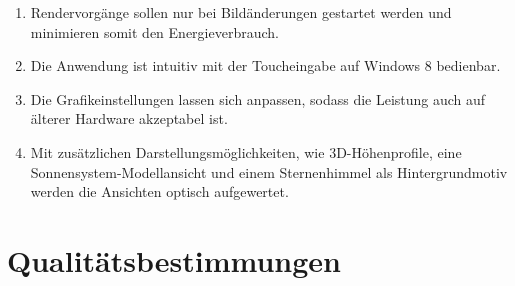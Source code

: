 \documentclass[10pt]{scrreprt}
\newcommand{\ziel}[1]{{\fontsize{9.5}{11}\textsf{/#1/}}}
\newcommand{\ziellabel}{Z}
\newcommand{\wunsch}{\renewcommand{\labelenumi}{\textbf{\ziel{\ziellabel\numprint{\theenumi}0W}}}}
\begin{document}
\begin{enumerate}[leftmargin=2.2cm]
\wunsch
\item Rendervorgänge sollen nur bei Bildänderungen gestartet werden und minimieren somit den Energieverbrauch.
\item Die Anwendung ist intuitiv mit der Toucheingabe auf Windows 8 bedienbar.
\item Die Grafikeinstellungen lassen sich anpassen, sodass die Leistung auch auf älterer Hardware akzeptabel ist.
\item Mit zusätzlichen Darstellungsmöglichkeiten, wie 3D-Höhenprofile, eine Sonnensystem-Modellansicht und einem Sternenhimmel als Hintergrundmotiv werden die Ansichten optisch aufgewertet.
\end{enumerate}



\chapter{Qualitätsbestimmungen}
\end{document}
